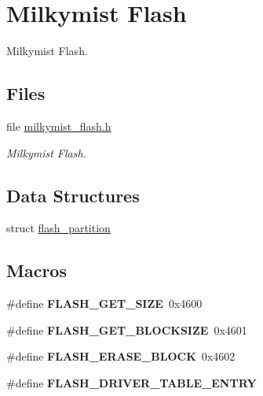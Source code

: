 \hypertarget{group__lm32__milkymist__flash}{}\section{Milkymist Flash}
\label{group__lm32__milkymist__flash}


Milkymist Flash.  


\subsection*{Files}
\begin{DoxyCompactItemize}
\item 
file \mbox{\hyperlink{milkymist__flash_8h}{milkymist\+\_\+flash.\+h}}
\begin{DoxyCompactList}\small\item\em Milkymist Flash. \end{DoxyCompactList}\end{DoxyCompactItemize}
\subsection*{Data Structures}
\begin{DoxyCompactItemize}
\item 
struct \mbox{\hyperlink{structflash__partition}{flash\+\_\+partition}}
\end{DoxyCompactItemize}
\subsection*{Macros}
\begin{DoxyCompactItemize}
\item 
\mbox{\label{group__lm32__milkymist__flash_ga254d3d5b0a12d4abf8a1db3bff94c8b0}} 
\#define {\bfseries F\+L\+A\+S\+H\+\_\+\+G\+E\+T\+\_\+\+S\+I\+ZE}~0x4600
\item 
\mbox{\label{group__lm32__milkymist__flash_gacef8777aa643a638619a7b17b513146c}} 
\#define {\bfseries F\+L\+A\+S\+H\+\_\+\+G\+E\+T\+\_\+\+B\+L\+O\+C\+K\+S\+I\+ZE}~0x4601
\item 
\mbox{\label{group__lm32__milkymist__flash_ga0b52ef2967625dd2333204b9ab02f288}} 
\#define {\bfseries F\+L\+A\+S\+H\+\_\+\+E\+R\+A\+S\+E\+\_\+\+B\+L\+O\+CK}~0x4602
\item 
\#define {\bfseries F\+L\+A\+S\+H\+\_\+\+D\+R\+I\+V\+E\+R\+\_\+\+T\+A\+B\+L\+E\+\_\+\+E\+N\+T\+RY}
\end{DoxyCompactItemize}
